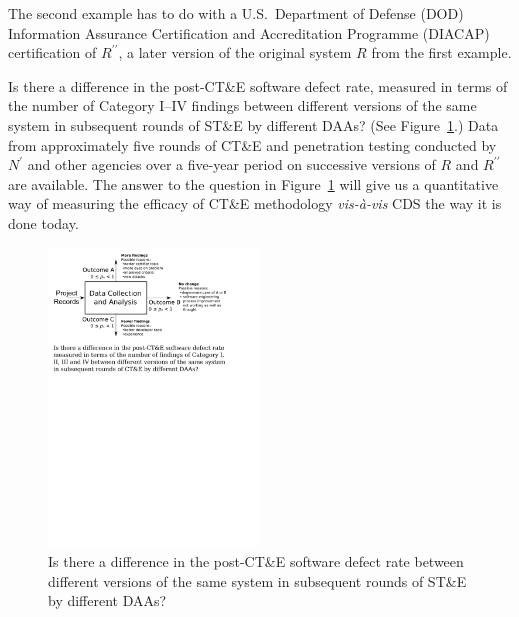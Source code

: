 \documentclass[10pt,letterpaper,conference,compsocconf]{IEEEtran}
\begin{document}
The second example has to do with a U.S.\ Department of Defense
(DOD) Information Assurance Certification and Accreditation Programme
(DIACAP) certification of $R^{\prime\prime}$, a later version of
the original system $R$ from the first example.

Is there a difference in the post-CT\&E software defect rate,
measured in terms of the number of Category I--IV findings
between different versions of the same system in subsequent rounds
of ST\&E by different DAAs?  (See Figure~\ref{figure:thesis-question}.)
Data from approximately five rounds of CT\&E and penetration testing
conducted by $N^\prime$ and other agencies over a five-year period
on successive versions of $R$ and $R^{\prime\prime}$ are available.
The answer to the question in Figure~\ref{figure:thesis-question}
will give us a quantitative way of measuring the efficacy
of CT\&E methodology {\it vis-\`{a}-vis} CDS the way it is done
today.

\begin{figure}[!t]
    \centering
	\includegraphics[width=0.5\textwidth,trim=0 20.5cm 3cm 0,clip]{thesis-question.pdf}
	\caption{Is there a difference in the post-CT\&E software
		defect rate between different versions of the same
		system in subsequent rounds of ST\&E by different
		DAAs?}
	\label{figure:thesis-question}
\end{figure}
\end{document}
